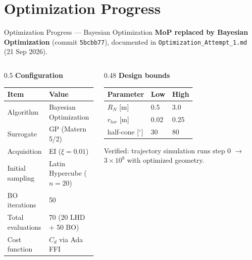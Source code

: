 \documentclass[aspectratio=169,10pt]{beamer}
\begin{document}
\section{Optimization Progress}

\begin{frame}{Optimization Progress --- Bayesian Optimization}
  \textbf{MoP replaced by Bayesian Optimization} (commit \texttt{5bcbb77}),
  documented in \texttt{Optimization\_Attempt\_1.md} (21 Sep 2026).\\[4pt]
  \begin{columns}[T]
    \begin{column}{0.5\textwidth}
      \textbf{Configuration}\\[2pt]
      \scriptsize
      \begin{tabular}{@{}ll@{}}
        \toprule
        Item & Value \\
        \midrule
        Algorithm & Bayesian Optimization \\
        Surrogate & GP (Matern 5/2) \\
        Acquisition & EI ($\xi=0.01$) \\
        Initial sampling & Latin Hypercube ($n=20$) \\
        BO iterations & 50 \\
        Total evaluations & 70 (20 LHD + 50 BO) \\
        Cost function & $C_d$ via Ada FFI \\
        \bottomrule
      \end{tabular}
    \end{column}
    \begin{column}{0.48\textwidth}
      \textbf{Design bounds}\\[2pt]
      \scriptsize
      \begin{tabular}{@{}lll@{}}
        \toprule
        Parameter & Low & High \\
        \midrule
        $R_N$ [m] & 0.5 & 3.0 \\
        $r_{tor}$ [m] & 0.02 & 0.25 \\
        half-cone [$^\circ$] & 30 & 80 \\
        \bottomrule
      \end{tabular}
      \vspace{6pt}
      \raggedright {\footnotesize Verified: trajectory simulation runs
      step 0 $\rightarrow$ $3\times10^{8}$ with optimized geometry.}
    \end{column}
  \end{columns}
\end{frame}
\end{document}
